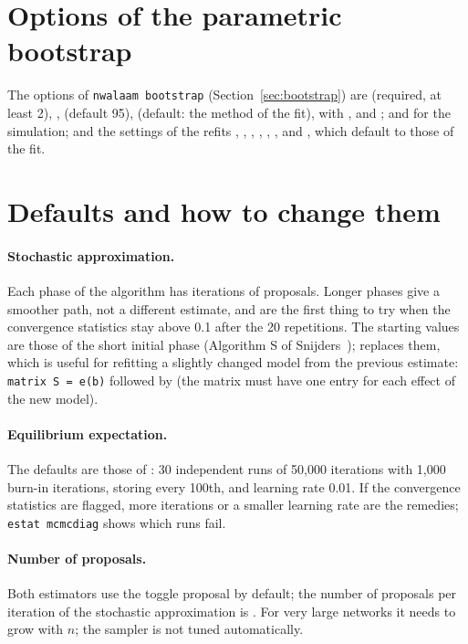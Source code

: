 \section{Options of the parametric bootstrap}

The options of \texttt{nwalaam bootstrap} (Section~\ref{sec:bootstrap}) are  (required, at least 2), ,  (default 95),  (default: the method of the fit),  with ,  and ;  and  for the simulation; and the settings of the refits , , , , , ,  and , which default to those of the fit.

\section{Defaults and how to change them}

\paragraph{Stochastic approximation.} Each phase of the algorithm has  iterations of  proposals. Longer phases give a smoother path, not a different estimate, and are the first thing to try when the convergence statistics stay above 0.1 after the 20 repetitions. The starting values are those of the short initial phase (Algorithm S of Snijders~\cite{snijders2002});  replaces them, which is useful for refitting a slightly changed model from the previous estimate: \texttt{matrix S = e(b)} followed by  (the matrix must have one entry for each effect of the new model).

\paragraph{Equilibrium expectation.} The defaults are those of \alaamee{}: 30 independent runs of 50,000 iterations with 1,000 burn-in iterations, storing every 100th, and learning rate 0.01. If the convergence statistics are flagged, more iterations or a smaller learning rate are the remedies; \texttt{estat mcmcdiag} shows which runs fail.

\paragraph{Number of proposals.} Both estimators use the toggle proposal by default; the number of proposals per iteration of the stochastic approximation is . For very large networks it needs to grow with $n$; the sampler is not tuned automatically.

